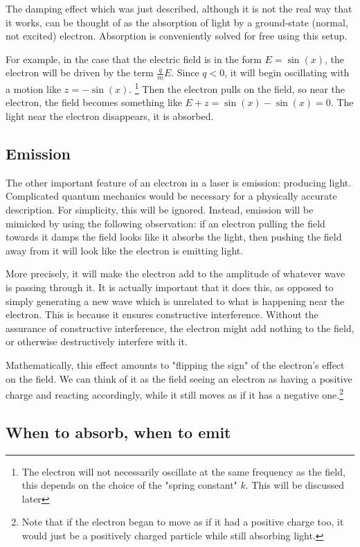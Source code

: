 \documentclass{article}
\begin{document}
The damping effect which was just described, although it is not the real way that it works, can be thought of as the absorption of light by a ground-state (normal, not excited) electron. Absorption is conveniently solved for free using this setup.

For example, in the case that the electric field is in the form $E = \sin(x)$, the electron will be driven by the term $\frac{q}{m} E$. Since $q < 0$, it will begin oscillating with a motion like $z = -\sin(x)$. \footnote{The electron will not necessarily oscillate at the same frequency as the field, this depends on the choice of the "spring constant" $k$. This will be discussed later} Then the electron pulls on the field, so near the electron, the field becomes something like $E + z = \sin(x) - \sin(x) = 0$. The light near the electron disappears, it is absorbed.

\subsection{Emission}

The other important feature of an electron in a laser is emission: producing light. Complicated quantum mechanics would be necessary for a physically accurate description. For simplicity, this will be ignored. Instead, emission will be mimicked by using the following observation: if an electron pulling the field towards it damps the field looks like it absorbs the light, then pushing the field away from it will look like the electron is emitting light.

More precisely, it will make the electron add to the amplitude of whatever wave is passing through it. It is actually important that it does this, as opposed to simply generating a new wave which is unrelated to what is happening near the electron. This is because it ensures constructive interference. Without the assurance of constructive interference, the electron might add nothing to the field, or otherwise destructively interfere with it.

Mathematically, this effect amounts to "flipping the sign" of the electron's effect on the field. We can think of it as the field seeing an electron as having a positive charge and reacting accordingly, while it still moves as if it has a negative one.\footnote{Note that if the electron began to move as if it had a positive charge too, it would just be a positively charged particle while still absorbing light.}

\subsection{When to absorb, when to emit}
\end{document}
